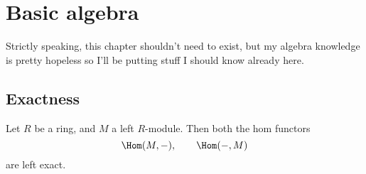 \documentclass[main.tex]{subfiles}
\begin{document}
\chapter{Basic algebra}
\label{ch:basic_algebra}

Strictly speaking, this chapter shouldn't need to exist, but my algebra knowledge is pretty hopeless so I'll be putting stuff I should know already here.

\section{Exactness}
\label{sec:_exactness}

\begin{proposition}
  \label{prop:hom_functor_left_exact}
  Let $R$ be a ring, and $M$ a left $R$-module. Then both the hom functors
  \begin{equation*}
    \Hom(M, -),\qquad \Hom(-, M)
  \end{equation*}
  are left exact.
\end{proposition}
\end{document}
